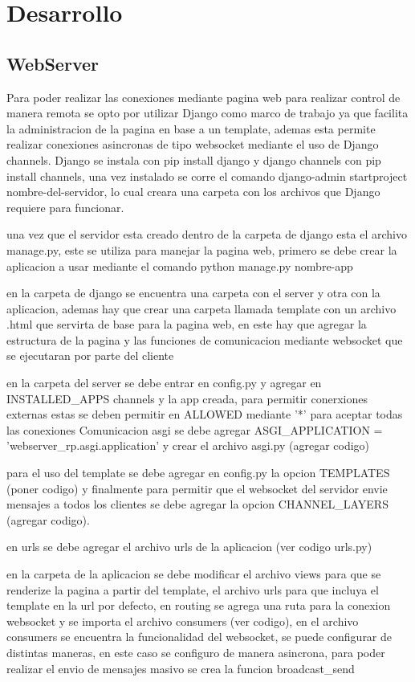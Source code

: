 \section{Desarrollo}
\subsection{WebServer}

Para poder realizar las conexiones mediante pagina web para realizar control de manera remota se opto por utilizar Django como marco de trabajo ya que facilita la administracion de la pagina en base a un template, ademas esta permite realizar conexiones asincronas de tipo websocket mediante el uso de Django channels.
Django se instala con pip install django y django channels con pip install channels, una vez instalado se corre el comando django-admin startproject nombre-del-servidor, lo cual creara una carpeta con los archivos que Django requiere para funcionar.

una vez que el servidor esta creado dentro de la carpeta de django esta el archivo manage.py, este se utiliza para manejar la pagina web, primero se debe crear la aplicacion a usar mediante el comando python manage.py nombre-app

en la carpeta de django se encuentra una carpeta con el server y otra con la aplicacion, ademas hay que crear una carpeta llamada template con un archivo .html que servirta de base para la pagina web, en este hay que agregar la estructura de la pagina y las funciones de comunicacion mediante websocket que se ejecutaran por parte del cliente

en la carpeta del server se debe entrar en config.py y agregar en INSTALLED\_APPS channels y la app creada, para permitir conerxiones externas estas se deben permitir en ALLOWED mediante '*' para aceptar todas las conexiones
Comunicacion asgi se debe agregar ASGI\_APPLICATION = 'webserver\_rp.asgi.application' y crear el archivo asgi.py (agregar codigo)

para el uso del template se debe agregar en config.py la opcion TEMPLATES (poner codigo) y finalmente para permitir que el websocket del servidor envie mensajes a todos los clientes se debe agregar la opcion CHANNEL\_LAYERS (agregar codigo).

en urls se debe agregar el archivo urls de la aplicacion (ver codigo urls.py)

en la carpeta de la aplicacion se debe modificar el archivo views para que se renderize la pagina a partir del template, el archivo urls para que incluya el template en la url por defecto, en routing se agrega una ruta para la conexion websocket y se importa el archivo consumers (ver codigo), en el archivo consumers se encuentra la funcionalidad del websocket, se puede configurar de distintas maneras, en este caso se configuro de manera asincrona, para poder realizar el envio de mensajes masivo se crea la funcion broadcast\_send

